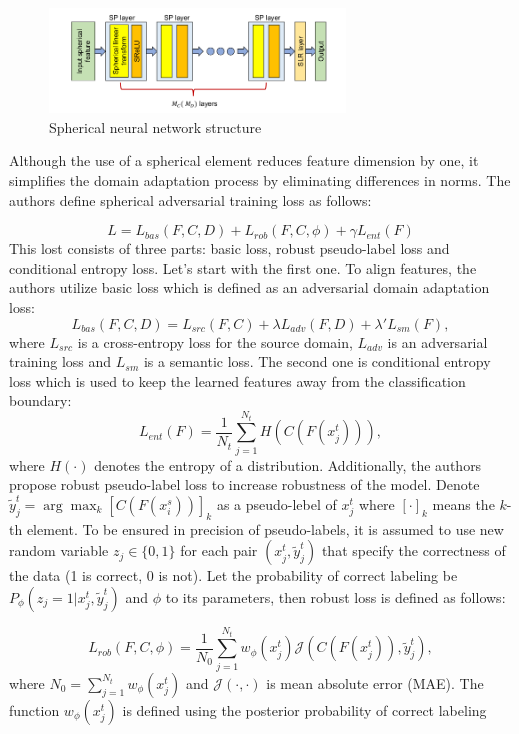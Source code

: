 \begin{figure}[H]
    \centering
    \includegraphics[width=0.7\textwidth]{Figures/From articles/sphere_layers.png}
    \caption{Spherical neural network structure}
    \label{fig: sphere_layers}
\end{figure}

Although the use of a spherical element reduces feature dimension by one, it simplifies the domain adaptation process by eliminating differences in norms. The authors define spherical adversarial training loss as follows:

$$
L = L_{bas}(F, C, D) + L_{rob}(F, C, \phi) + \gamma L_{ent}(F)
$$
This lost consists of three parts: basic loss, robust pseudo-label loss and conditional entropy loss. Let's start with the first one. To align features, the authors utilize basic loss which is defined as an adversarial domain adaptation loss:
$$
L_{bas}(F, C, D) = L_{src}(F, C) + \lambda L_{adv}(F, D) + \lambda' L_{sm}(F),
$$
where $L_{src}$ is a cross-entropy loss for the source domain, $L_{adv}$ is an adversarial training loss and $L_{sm}$ is a semantic loss. The second one is conditional entropy loss which is used to keep the learned features away from the classification boundary:
$$
L_{ent}(F) = \dfrac{1}{N_t} \sum_{j=1}^{N_t} H(C(F(x_j^t))),
$$
where $H(\cdot)$ denotes the entropy of a distribution. Additionally, the authors propose robust pseudo-label loss to increase robustness of the model. Denote $\tilde{y}_j^t = \arg \max_k [C(F(x_i^s))]_k$ as a pseudo-lebel of $x_j^t$ where $[\cdot]_k$ means the $k$-th element. To be ensured in precision of pseudo-labels, it is assumed to use new random variable $z_j \in \{0, 1\}$ for each pair $(x_j^t, \tilde{y}_j^t)$ that specify the correctness of the data (1 is correct, 0 is not). Let the probability of correct labeling be $P_\phi (z_j = 1| x_j^t, \tilde{y}_j^t)$ and $\phi$ to its parameters, then robust loss is defined as follows:

$$
L_{rob}(F, C, \phi) = \dfrac{1}{N_0}\sum_{j=1}^{N_t} w_\phi(x_j^t) \mathcal{J}(C(F(x_j^t)), \tilde{y}_j^t),
$$
where $N_0 = \sum_{j=1}^{N_t} w_\phi(x_j^t)$ and $\mathcal{J}(\cdot, \cdot)$ is mean absolute error (MAE). The function $w_\phi (x_j^t)$ is defined using the posterior probability of correct labeling 

